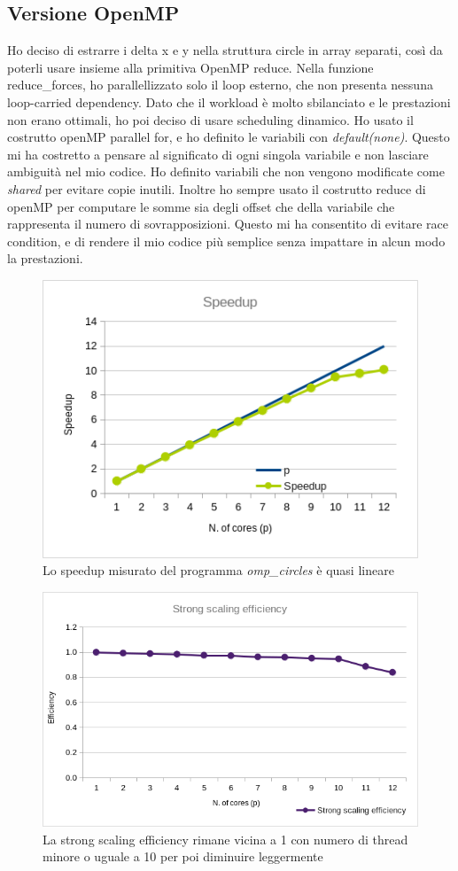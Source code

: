 \documentclass[a4paper,11pt, twoside]{report}
\begin{document}
\subsection*{Versione OpenMP}
Ho deciso di estrarre i delta x e y nella struttura circle in array separati, così da poterli usare insieme alla primitiva OpenMP reduce.
Nella funzione reduce\_forces, ho parallellizzato solo il loop esterno, che non presenta nessuna loop-carried dependency.
Dato che il workload è molto sbilanciato e le prestazioni non erano ottimali, ho poi deciso di usare scheduling dinamico.
Ho usato il costrutto openMP parallel for, e ho definito le variabili con \textit{default(none)}.
Questo mi ha costretto a pensare al significato di ogni singola variabile e non lasciare ambiguità nel mio codice.
Ho definito variabili che non vengono modificate come \textit{shared} per evitare copie inutili.
Inoltre ho sempre usato il costrutto reduce di openMP per computare le somme sia degli offset che della variabile che rappresenta il numero di sovrapposizioni.
Questo mi ha consentito di evitare race condition, e di rendere il mio codice più semplice senza impattare in alcun modo la prestazioni.
\begin{figure}[H]
    \includegraphics[scale=0.5]{images/omp_speedup.png}
    \caption[]{Lo speedup misurato del programma \textit{omp\_circles} è quasi lineare}
\end{figure}
\begin{figure}[H]
    \includegraphics[scale=0.5]{images/omp_strong.png}
    \caption[]{La strong scaling efficiency rimane vicina a 1 con numero di thread minore o uguale a 10 per poi diminuire leggermente}
\end{figure}
\end{document}
